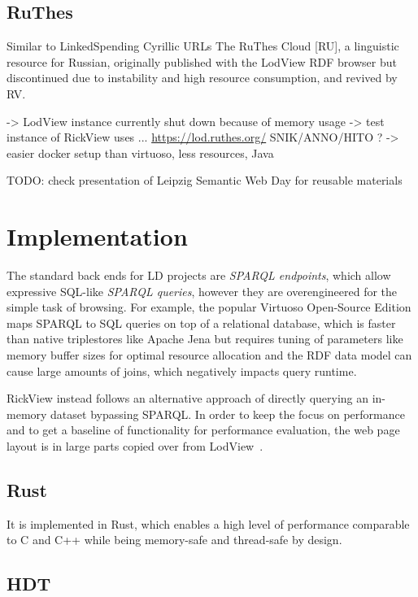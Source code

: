 \documentclass{ceurart}
\begin{document}
\subsection{RuThes}
\citep{ruthes}
Similar to LinkedSpending
Cyrillic URLs
The RuThes Cloud [RU], a linguistic resource for Russian, originally published with the LodView RDF browser but discontinued due to instability and high resource consumption, and revived by RV.

-> LodView instance currently shut down because of memory usage
-> test instance of RickView uses ...
\url{https://lod.ruthes.org/}
SNIK/ANNO/HITO ?
-> easier docker setup than virtuoso, less resources, Java 



TODO: check presentation of Leipzig Semantic Web Day for reusable materials

\section{Implementation}\label{implementation}

The standard back ends for LD projects are \emph{SPARQL endpoints}, which allow expressive SQL-like \emph{SPARQL queries}, however they are overengineered for the simple task of browsing.
For example, the popular Virtuoso Open-Source Edition maps SPARQL to SQL queries on top of a relational database, which is faster than native triplestores like Apache Jena but requires tuning of parameters like memory buffer sizes for optimal resource allocation and the RDF data model can cause large amounts of joins, which negatively impacts query runtime.

RickView instead follows an alternative approach of directly querying an in-memory dataset bypassing SPARQL.
In order to keep the focus on performance and to get a baseline of functionality for performance evaluation, the web page layout is in large parts copied
over from LodView~\citep{lodview,adaptinglodview}.
%
%
\subsection{Rust}
It is implemented in Rust, which enables a high level of performance comparable to C and C++ while being memory-safe and thread-safe by design.

\subsection{HDT}
\end{document}
